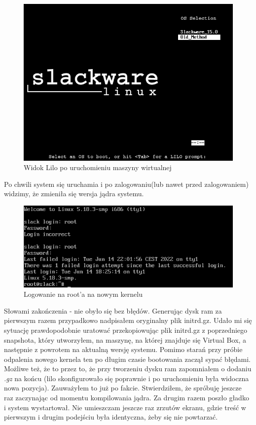 \documentclass[a4paper,12pt,oneside]{book} %
\begin{document}
\begin{figure}[h]
	\centering
	\includegraphics[scale=0.6]{25-lilo-view}
	\caption{Widok Lilo po uruchomieniu maszyny wirtualnej}
\end{figure}

Po chwili system się uruchamia i po zalogowaniu(lub nawet przed zalogowaniem) widzimy, że zmieniła się wersja jądra systemu.

\begin{figure}[h]
	\centering
	\includegraphics[scale=0.6]{26-success}
	\caption{Logowanie na root'a na nowym kernelu}
\end{figure}

Słowami zakończenia - nie obyło się bez błędów. Generując dysk ram za pierwszym razem przypadkowo nadpisałem oryginalny plik initrd.gz. Udało mi się sytuację prawdopodobnie uratować przekopiowując plik initrd.gz z poprzedniego snapshota, który utworzyłem, na maszynę, na której znajduje się Virtual Box, a następnie z powrotem na aktualną wersję systemu. Pomimo starań przy próbie odpalenia nowego kernela ten po długim czasie bootowania zaczął sypać błędami. Możliwe też, że to przez to, że przy tworzeniu dysku ram zapomniałem o dodaniu \emph{.gz} na końcu (lilo skonfigurowało się poprawnie i po uruchomieniu była widoczna nowa pozycja). Zauważyłem to już po fakcie. Stwierdziłem, że spróbuję jeszcze raz zaczynając od momentu kompilowania jądra. Za drugim razem poszło gładko i system wystartował. Nie umieszczam jeszcze raz zrzutów ekranu, gdzie treść w pierwszym i drugim podejściu była identyczna, żeby się nie powtarzać. 
\end{document}
